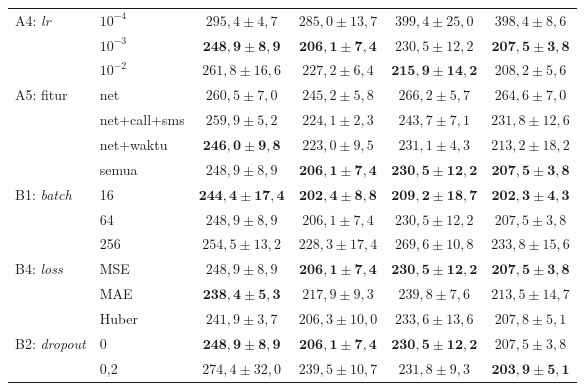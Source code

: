 \documentclass[conference,a4paper]{IEEEtran}
\begin{document}
\begin{table}[t]
\begin{tabular}{@{}llcccc@{}}
    \midrule
    A4: \textit{lr} & $10^{-4}$ & $295{,}4 \pm 4{,}7$ & $285{,}0 \pm 13{,}7$ & $399{,}4 \pm 25{,}0$ & $398{,}4 \pm 8{,}6$ \\
                    & $10^{-3}$ & $\mathbf{248{,}9 \pm 8{,}9}$ & $\mathbf{206{,}1 \pm 7{,}4}$ & $230{,}5 \pm 12{,}2$ & $\mathbf{207{,}5 \pm 3{,}8}$ \\
                    & $10^{-2}$ & $261{,}8 \pm 16{,}6$ & $227{,}2 \pm 6{,}4$ & $\mathbf{215{,}9 \pm 14{,}2}$ & $208{,}2 \pm 5{,}6$ \\
    \midrule
    A5: fitur & net          & $260{,}5 \pm 7{,}0$ & $245{,}2 \pm 5{,}8$ & $266{,}2 \pm 5{,}7$ & $264{,}6 \pm 7{,}0$ \\
              & net+call+sms & $259{,}9 \pm 5{,}2$ & $224{,}1 \pm 2{,}3$ & $243{,}7 \pm 7{,}1$ & $231{,}8 \pm 12{,}6$ \\
              & net+waktu    & $\mathbf{246{,}0 \pm 9{,}8}$ & $223{,}0 \pm 9{,}5$ & $231{,}1 \pm 4{,}3$ & $213{,}2 \pm 18{,}2$ \\
              & semua        & $248{,}9 \pm 8{,}9$ & $\mathbf{206{,}1 \pm 7{,}4}$ & $\mathbf{230{,}5 \pm 12{,}2}$ & $\mathbf{207{,}5 \pm 3{,}8}$ \\
    \midrule
    B1: \textit{batch} & 16  & $\mathbf{244{,}4 \pm 17{,}4}$ & $\mathbf{202{,}4 \pm 8{,}8}$ & $\mathbf{209{,}2 \pm 18{,}7}$ & $\mathbf{202{,}3 \pm 4{,}3}$ \\
                       & 64  & $248{,}9 \pm 8{,}9$ & $206{,}1 \pm 7{,}4$ & $230{,}5 \pm 12{,}2$ & $207{,}5 \pm 3{,}8$ \\
                       & 256 & $254{,}5 \pm 13{,}2$ & $228{,}3 \pm 17{,}4$ & $269{,}6 \pm 10{,}8$ & $233{,}8 \pm 15{,}6$ \\
    \midrule
    B4: \textit{loss} & MSE   & $248{,}9 \pm 8{,}9$ & $\mathbf{206{,}1 \pm 7{,}4}$ & $\mathbf{230{,}5 \pm 12{,}2}$ & $\mathbf{207{,}5 \pm 3{,}8}$ \\
                      & MAE   & $\mathbf{238{,}4 \pm 5{,}3}$ & $217{,}9 \pm 9{,}3$ & $239{,}8 \pm 7{,}6$ & $213{,}5 \pm 14{,}7$ \\
                      & Huber & $241{,}9 \pm 3{,}7$ & $206{,}3 \pm 10{,}0$ & $233{,}6 \pm 13{,}6$ & $207{,}8 \pm 5{,}1$ \\
    \midrule
    B2: \textit{dropout} & 0   & $\mathbf{248{,}9 \pm 8{,}9}$ & $\mathbf{206{,}1 \pm 7{,}4}$ & $\mathbf{230{,}5 \pm 12{,}2}$ & $207{,}5 \pm 3{,}8$ \\
                         & 0,2 & $274{,}4 \pm 32{,}0$ & $239{,}5 \pm 10{,}7$ & $231{,}8 \pm 9{,}3$ & $\mathbf{203{,}9 \pm 5{,}1}$ \\

\end{tabular}
\end{table}
\end{document}

